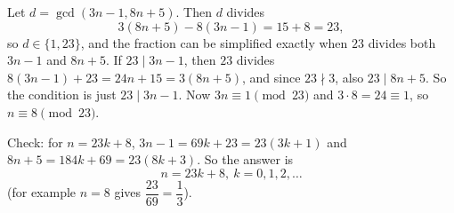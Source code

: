 Let $d=\gcd(3n-1,8n+5)$. Then $d$ divides
\[
3(8n+5)-8(3n-1)=15+8=23 ,
\]
so $d\in\{1,23\}$, and the fraction can be simplified exactly when $23$ divides both $3n-1$ and $8n+5$. If $23\mid3n-1$, then $23$ divides $8(3n-1)+23=24n+15=3(8n+5)$, and since $23\nmid3$, also $23\mid8n+5$. So the condition is just $23\mid3n-1$. Now $3n\equiv1\pmod{23}$ and $3\cdot8=24\equiv1$, so $n\equiv8\pmod{23}$.

Check: for $n=23k+8$, $3n-1=69k+23=23(3k+1)$ and $8n+5=184k+69=23(8k+3)$. So the answer is
\[
\boxed{n=23k+8,\ k=0,1,2,\dots}
\]
(for example $n=8$ gives $\dfrac{23}{69}=\dfrac{1}{3}$).
